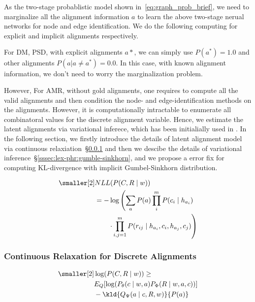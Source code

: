 As the two-stage probablistic model shown
in~\autoref{eq:graph_prob_brief}, we need to marginalize all the
alignment information $a$ to learn the above two-stage nerual networks
for node and edge identification. We do the following computing for
explicit and implicit alignments respectively.

 For DM, PSD, with explicit alignments
$a*$, we can simply use $P(a^{*}) = 1.0$ and other alignments
$P(a | a \neq a^{*}) = 0.0 $. In this case, with known alignment
information, we don't need to worry the marginalization problem.

 However, For AMR, without gold
alignments, one requires to compute all the valid alignments and then
condition the node- and edge-identification methods on the alignments.
However, it is computationally intractable to enumerate all
combinatoral values for the discrete alignment variable. Hence, we
estimate the latent alignments via variational inferece, which has
been initialially used in \citet{lyu2018amr}. In the following
section, we firstly introduce the details of latent alignment model
via continuous relaxiation~\S\ref{sssec:lex-phr:alignment-relax} and
then we descibe the details of variational
inference~\S\ref{sssec:lex-phr:gumble-sinkhorn}, and we propose a
error fix for computing KL-divergence with implicit Gumbel-Sinkhorn
distribution.

\begin{equation}
  \label{eq:graph_prob_brief}
\begin{aligned} \smaller[2]
 & NLL(P(C,R \mid w)) \\
 & = - \log\left(\sum_{a}P(a) \prod_{i}^{m} P(c_{i} \mid h_{a_{i}}) \right. \\
 & \qquad \left.\cdot \prod_{i,j=1}^{m}P(r_{ij} \mid h_{a_{i}}, c_{i}, h_{a_{j}}, c_{j})\right)
\end{aligned}
\end{equation}

\subsubsection{Continuous Relaxation for Discrete Alignments}
\label{sssec:lex-phr:alignment-relax}

\begin{equation}
 \label{eq:elbo}
\begin{aligned} \smaller[2]
  & \log(P(C,R \mid w)) \geq \\
  & E_{Q}[\log(P_{\theta}(c\mid w,a) P_{\Phi}(R\mid w,a,c))] \\
  & - \kld{Q_{\Psi}(a\mid c, R,w)}{P(a)}
\end{aligned}
\end{equation}

